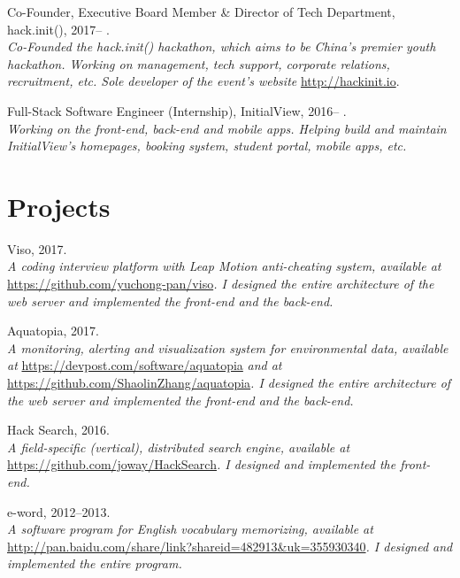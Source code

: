 \documentclass[letterpaper]{article}
\renewenvironment{itemize}{
  \begin{list}{}{
    \setlength{\leftmargin}{1.5em}
  }
}{
  \end{list}
}
\begin{document}
\begin{itemize}
  \item Co-Founder, Executive Board Member \& Director of Tech Department, hack.init(), 2017-- .\\
  \emph{Co-Founded the hack.init() hackathon, which aims to be China's premier youth hackathon. Working on management, tech support, corporate relations, recruitment, etc. Sole developer of the event's website }\url{http://hackinit.io}{.}

  \item Full-Stack Software Engineer (Internship), InitialView, 2016-- .\\
  \emph{Working on the front-end, back-end and mobile apps. Helping build and maintain InitialView's homepages, booking system, student portal, mobile apps, etc.}
\end{itemize}


\section*{Projects}

\begin{itemize}
  \item Viso, 2017.\\
  \emph{A coding interview platform with Leap Motion anti-cheating system, available at }\url{https://github.com/yuchong-pan/viso}\emph{. I designed the entire architecture of the web server and implemented the front-end and the back-end.}

  \item Aquatopia, 2017.\\
  \emph{A monitoring, alerting and visualization system for environmental data, available at }\url{https://devpost.com/software/aquatopia}\emph{ and at }\url{https://github.com/ShaolinZhang/aquatopia}\emph{. I designed the entire architecture of the web server and implemented the front-end and the back-end.}

  \item Hack Search, 2016.\\
  \emph{A field-specific (vertical), distributed search engine, available at }\url{https://github.com/joway/HackSearch}\emph{. I designed and implemented the front-end.}

  \item e-word, 2012--2013.\\
  \emph{A software program for English vocabulary memorizing, available at }\url{http://pan.baidu.com/share/link?shareid=482913&uk=355930340}\emph{. I designed and implemented the entire program.}

\end{itemize}
\end{document}
